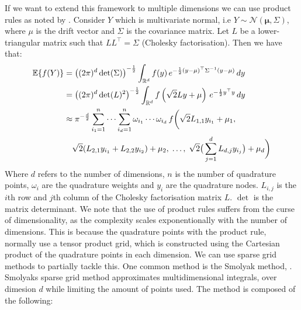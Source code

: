 \documentclass[11pt]{article}
\begin{document}
If we want to extend this framework to multiple dimensions we can use product rules as noted by \textcite{CaiJuddXu2013}.
Consider $Y$ which is multivariate normal, i.e $Y \sim \mathcal{N}(\boldsymbol{\mu} , \Sigma)$,
where $\mu$ is the drift vector and $\Sigma$ is the covariance matrix.
Let $L$ be a lower-triangular matrix such that $LL^{\top} = \Sigma$ (Cholesky factorisation).
Then we have that:
\begin{align}
  \mathbb{E}\{f(Y)\} & = \left( (2\pi)^d \det(\Sigma) \right)^{-\frac{1}{2}} \int_{\mathbb{R}^d} f(y) \, e^{-\frac{1}{2}(y - \mu)^{\top} \Sigma^{-1} (y - \mu)} \, dy \\
  & = \left( (2\pi)^d \det(L)^2 \right)^{-\frac{1}{2}} \int_{\mathbb{R}^d} f\left(\sqrt{2} L y + \mu\right) \, e^{-\frac{1}{2} y^{\top} y} \, dy \\
  & \approx \pi^{-\frac{d}{2}} \sum_{i_1=1}^n \cdots \sum_{i_d=1}^n \omega_{i_1} \cdots \omega_{i_d} \, f
  \bigg(\sqrt{2} L_{1,1} y_{i_1} + \mu_1, \;
  \notag \\
  & \quad \sqrt{2} (L_{2,1} y_{i_1} + L_{2,2} y_{i_2}) + \mu_2, \;
  \ldots, \;
  \sqrt{2} \big(\sum_{j=1}^d L_{d,j} y_{i_j}\big) + \mu_d
  \bigg) 
  \end{align}
Where $d$ refers to the number of dimensions, $n$ is the number of quadrature points, $\omega_i$ are the quadrature weights and $y_i$ are the quadrature nodes.
$L_{i,j}$ is the $i$th row and $j$th column of the Cholesky factorisation matrix $L$. $\det$ is the matrix determinant.
We note that the use of product rules suffers from the curse of dimensionality, 
as the complexity scales exponentionally with the number of dimensions. This is because the quadrature points with the product rule,
normally use a tensor product grid, which is constructed using the Cartesian product of the quadrature points in each dimension.
We can use sparse grid methods to partially tackle this. One common method  is the Smolyak method, \textcite{smolyak1963}.
Smolyaks sparse grid method approximates multidimensional integrals, over dimesion $d$
while limiting the amount of points used. The method is composed of the following:
\end{document}
